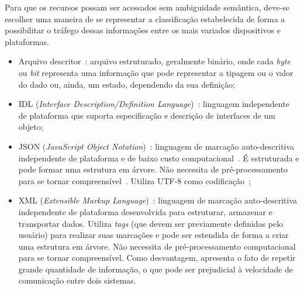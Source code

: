 Para que os recursos possam ser acessados sem ambiguidade semântica, deve-se escolher uma maneira de se representar a classificação estabelecida de forma a possibilitar o tráfego dessas informações entre os mais variados dispositivos e plataformas.

\begin{itemize}
	\item Arquivo descritor~\cite{usb3spec}: arquivo estruturado, geralmente binário, onde cada \emph{byte} ou \emph{bit} representa uma informação que pode representar a tipagem ou o valor do dado ou, ainda, um estado, dependendo da sua definição;
	

	
	\item IDL (\emph{Interface Description/Definition Language})~\cite{davidIDL}: linguagem independente de plataforma que suporta especificação e descrição de interfaces de um objeto;

	\item JSON (\emph{JavaScript Object Notation})~\cite{json}: linguagem de marcação auto-descritiva independente de plataforma e de baixo custo computacional~\cite{comparativojson}. É estruturada e pode formar uma estrutura em árvore. Não necessita de pré-processamento para se tornar compreensível~\cite{comparativojson}. Utiliza UTF-8 como codificação~\cite{utf8};
	

	\item XML (\emph{Extensible Markup Language})~\cite{xml}: linguagem de marcação auto-descritiva independente de plataforma desenvolvida para estruturar, armazenar e transportar dados. Utiliza \emph{tags} (que devem ser previamente definidas pelo usuário) para realizar suas marcações e pode ser estendida de forma a criar uma estrutura em árvore. Não necessita de pré-processamento computacional para se tornar compreensível. Como desvantagem, apresenta o fato de repetir grande quantidade de informação, o que pode ser prejudicial à velocidade de comunicação entre dois sistemas.
\end{itemize}

